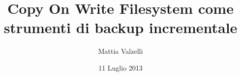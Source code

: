\documentclass{beamer}
\title[COW Filesystem]{Copy On Write Filesystem come strumenti di backup incrementale}
\author[Mattia Valzelli]{Mattia Valzelli}
\institute[Univr]{Universit\`{a} degli studi di Verona}
\date{11 Luglio 2013}
\begin{document}
\begin{frame}
\titlepage
\end{frame}
\end{document}
